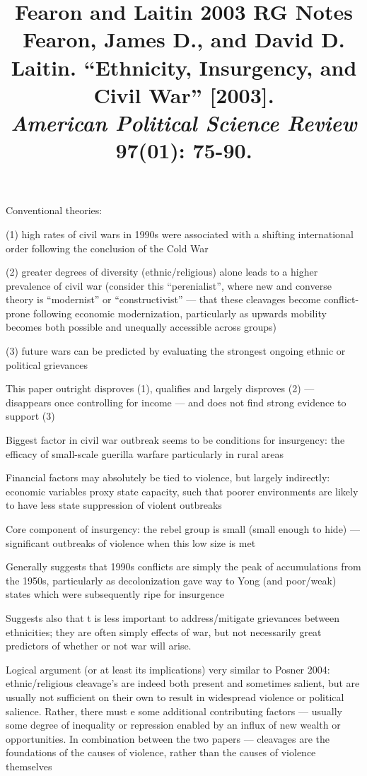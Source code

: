 \documentclass[12pt]{article}
\title{\textbf{Fearon and Laitin 2003 RG Notes}\\
\large Fearon, James D., and David D. Laitin. ``Ethnicity, Insurgency, and Civil War'' [2003].\\
\textit{American Political Science Review} 97(01): 75-90.}
\author{}
\date{}
\begin{document}
\maketitle

Conventional theories:

(1) high rates of civil wars in 1990s were associated with a shifting international order following the conclusion of the Cold War

(2) greater degrees of diversity (ethnic/religious) alone leads to a higher prevalence of civil war (consider this ``perenialist'', where new and converse theory is ``modernist'' or ``constructivist'' --- that these cleavages become conflict-prone following economic modernization, particularly as upwards mobility becomes both possible and unequally accessible across groups)

(3) future wars can be predicted by evaluating the strongest ongoing ethnic or political grievances

This paper outright disproves (1), qualifies and largely disproves (2) --- disappears once controlling for income --- and does not find strong evidence to support (3)

Biggest factor in civil war outbreak seems to be conditions for insurgency: the efficacy of  small-scale guerilla warfare particularly in rural areas

Financial factors may absolutely be tied to violence, but largely indirectly: economic variables proxy state capacity, such that poorer environments are likely to have less state suppression of violent outbreaks

Core component of insurgency: the rebel group is small (small enough to hide) --- significant outbreaks of violence when this low size is met

Generally suggests that 1990s conflicts are simply the peak of accumulations from the 1950s, particularly as decolonization gave way to Yong (and poor/weak) states which were subsequently ripe for insurgence

Suggests also that t is less important to address/mitigate grievances between ethnicities; they are often simply effects of war, but not necessarily great predictors of whether or not war will arise.

Logical argument (or at least its implications) very similar to Posner 2004: ethnic/religious cleavage's are indeed both present and sometimes salient, but are usually not sufficient on their own to result in widespread violence or political salience. Rather, there must e some additional contributing factors --- usually some degree of inequality or repression enabled by an influx of new wealth or opportunities. In combination between the two papers --- cleavages are the foundations of the causes of violence, rather than the causes of violence themselves
\end{document}
